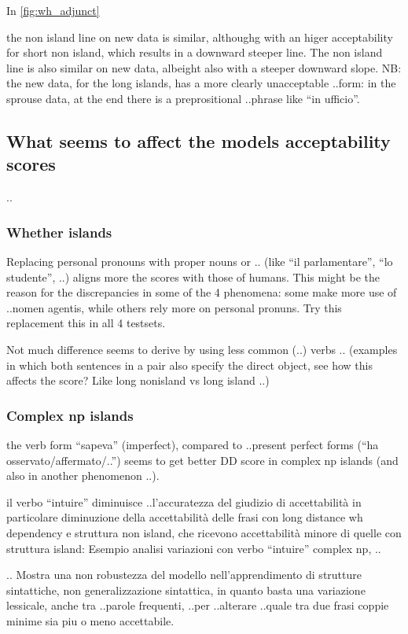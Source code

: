 In \autoref{fig:wh_adjunct}

the non island line on new data is similar, althoughg with an higer acceptability for short non island, which results in a downward steeper line. The non island line is also similar on new data, albeight also with a steeper downward slope.
NB: the new data, for the long islands, has a more clearly unacceptable ..form: in the sprouse data, at the end there is a preprositional ..phrase like “in ufficio”.


\subsection{What seems to affect the models acceptability scores}
..
\subsubsection{Whether islands}
Replacing personal pronouns with proper nouns or .. (like “il parlamentare”, “lo studente”, ..) aligns more the scores with those of humans.
This might be the reason for the discrepancies in some of the 4 phenomena: some make more use of ..nomen agentis, while others rely more on personal pronuns.
Try this replacement this in all 4 testsets.

Not much difference seems to derive by using less common (..) verbs .. 
(examples in which both sentences in a pair also specify the direct object, see how this affects the score? Like long nonisland vs long island ..)

\subsubsection{Complex np islands}
the verb form “sapeva” (imperfect), compared to ..present perfect forms (“ha osservato/affermato/..”) seems to get better DD score in complex np islands (and also in another phenomenon ..).

il verbo “intuire” diminuisce ..l’accuratezza del giudizio di accettabilità
in particolare diminuzione della accettabilità delle frasi con long distance wh dependency e struttura non island, che ricevono accettabilità minore di quelle con struttura island:
Esempio analisi variazioni con verbo “intuire” complex np, ..

..
Mostra una non robustezza del modello nell’apprendimento di strutture sintattiche, non generalizzazione sintattica, in quanto basta una variazione lessicale, anche tra ..parole frequenti, ..per ..alterare ..quale tra due frasi coppie minime sia piu o meno accettabile.

